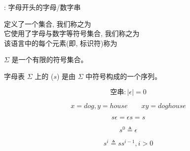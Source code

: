 \begin{frame}{}
  \begin{center}
    \id: 字母开头的字母/数字串

    \vspace{0.80cm}
    \id{} 定义了一个集合, 我们称之为 \\[15pt]
    它使用了字母与数字等符号集合, 我们称之为 \\[15pt]
    该语言中的每个元素(即, 标识符)称为
  \end{center}
\end{frame}

\begin{frame}{}
  \begin{definition}[字母表]
     $\Sigma$ 是一个有限的符号集合。
  \end{definition}
  
\end{frame}

\begin{frame}{}
  \begin{definition}[串]
    字母表 $\Sigma$ 上的 ($s$) 是由 $\Sigma$ 中符号构成的一个序列。
  \end{definition}

  \vspace{-0.30cm}
  \[
    \text{空串}: |\epsilon| = 0
  \]
\end{frame}

\begin{frame}{}
  \begin{definition}[串上的``连接''运算]
    \[
      x = dog, y = house \qquad xy = doghouse
    \]

    \[
      s \epsilon = \epsilon s = s
    \]
  \end{definition}

  \pause
  \vspace{0.60cm}
  \begin{definition}[串上的``指数''运算]
    \[
      s^{0} \triangleq \epsilon
    \]

    \[
      s^{i} \triangleq s s^{i-1}, i > 0
    \]
  \end{definition}
\end{frame}

